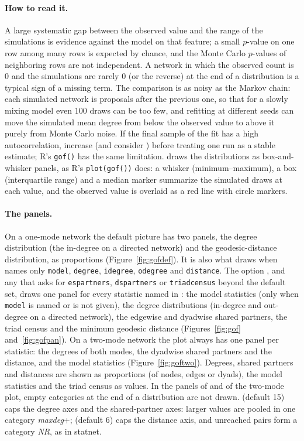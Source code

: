 \paragraph{How to read it.} A large systematic gap between the observed value and the range of the simulations is evidence against the model on that feature; a small $p$-value on one row among many rows is expected by chance, and the Monte Carlo $p$-values of neighboring rows are not independent. A network in which the observed count is 0 and the simulations are rarely 0 (or the reverse) at the end of a distribution is a typical sign of a missing term. The comparison is as noisy as the Markov chain: each simulated network is  proposals after the previous one, so that for a slowly mixing model even 100 draws can be too few, and refitting at different seeds can move the simulated mean degree from below the observed value to above it purely from Monte Carlo noise. If the final sample of the fit has a high autocorrelation, increase  (and consider ) before treating one run as a stable estimate; R's \texttt{gof()} has the same limitation.  draws the distributions as box-and-whisker panels, as R's \texttt{plot(gof())} does: a whisker (minimum--maximum), a box (interquartile range) and a median marker summarize the simulated draws at each value, and the observed value is overlaid as a red line with circle markers.

\paragraph{The panels.} On a one-mode network the default picture has two panels, the degree distribution (the in-degree on a directed network) and the geodesic-distance distribution, as proportions (Figure~\ref{fig:gofdef}). It is also what  draws when  names only \texttt{model}, \texttt{degree}, \texttt{idegree}, \texttt{odegree} and \texttt{distance}. The option , and any  that asks for \texttt{espartners}, \texttt{dspartners} or \texttt{triadcensus} beyond the default set, draws one panel for every statistic named in : the model statistics (only when \texttt{model} is named or  is not given), the degree distributions (in-degree and out-degree on a directed network), the edgewise and dyadwise shared partners, the triad census and the minimum geodesic distance (Figures~\ref{fig:gof} and~\ref{fig:gofpan}). On a two-mode network the plot always has one panel per statistic: the degrees of both modes, the dyadwise shared partners and the distance, and the model statistics (Figure~\ref{fig:goftwo}). Degrees, shared partners and distances are shown as proportions (of nodes, edges or dyads), the model statistics and the triad census as values. In the panels of  and of the two-mode plot, empty categories at the end of a distribution are not drawn.  (default 15) caps the degree axes and the shared-partner axes: larger values are pooled in one category \emph{maxdeg}+;  (default 6) caps the distance axis, and unreached pairs form a category \emph{NR}, as in statnet.

